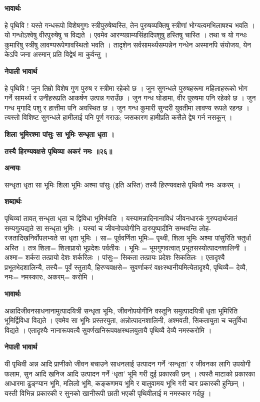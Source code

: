 \documentclass[11pt, a5paper]{article}
\begin{document}
\textbf{भावार्थः}

हे पृथिवि ! यस्ते गन्धरूपो विशेषगुणः स्त्रीपुरुषेष्वस्ति, तेन पुरुषव्यक्तिषु स्त्रीणां भोग्यत्वमभिलाषश्च भवति । यो गन्धोऽश्वेषु वीरपुरुषेषु च विद्यते । एवमेव आरण्यग्राम्यसिंहादिपशुषु हस्तिषु चास्ति । तथा च यो गन्धः कुमारिषु स्त्रीषु लावण्यरूपेणावस्थितो भवति । तादृशेन सर्वसामर्थ्यसम्पन्नेन गन्धेन अस्मानपि संयोजय, येन केऽपि जना अस्मान् प्रति विद्वेषं मा कुर्वन्तु ।

\textbf{नेपाली भावार्थ}

हे पृथिवि ! जुन तिम्रो विशेष गुण पुरुष र स्त्रीमा रहेको छ । जुन सुगन्धले पुरुषहरूमा महिलाहरूको भोग गर्ने सामर्थ्य र उनीहरूप्रति आकर्षण उत्पन्न गराउँछ । जुन गन्ध घोडामा, वीर पुरुषमा पनि रहेको छ । जुन गन्ध मृगादि पशु र हात्तीमा पनि अवस्थित छ । जुन गन्ध कुमारी सुन्दरी युवतीमा लावण्य रूपले रहन्छ । त्यस्तो विशिष्ट सुगन्धले हामीलाई पनि पूर्ण गराऊ; जसकारण हामीप्रति कसैले द्वेष गर्न नसकून् ।

\textbf{शिला भूमिरश्मा पांसुः सा भूमिः सन्धृता धृता ।}

\textbf{तस्यै हिरण्यवक्षसे पृथिव्या अकरं नमः ॥२६॥}

\textbf{अन्वयः}

सन्धृता धृता सा भूमिः शिला भूमिः अश्मा पांसुः (इति अस्ति) तस्यै हिरण्यवक्षसे पृथिव्यै नमः अकरम् ।

\textbf{शब्दार्थः}

पृथिव्यां तावत् सन्धृता धृता च द्विविधा भूमिर्भवति । यस्यामन्नादिनानाविधं जीवनधारकं गुरुपदार्थजातं सम्यगुत्पद्यते सा सन्धृता भूमिः । यस्यां च जीवनोपयोगीनि दारुपुष्पादीनि सम्भवन्ति लोह-रजतादिखनिर्वोपलभ्यते सा धृता भूमिः । सा= पूर्ववर्णिता भूमिः= पृथ्वी, शिला भूमिः अश्मा पांसुरिति चतुर्धा अस्ति । तत्र शिला= शिलाप्रायो भूप्रदेशः पर्वतीयः । भूमिः =  भूमगुणवत्वात् प्रभूतसस्योत्पादनशालिनी । अश्मा= शर्करा तत्प्रायो देशः शर्करिलः । पांसुः= सिकता तत्प्रायः प्रदेशः सिकतिलः । एतादृश्यै प्रभूतभेदशालिन्यै, तस्यै= पूर्वं स्तुतायै, हिरण्यवक्षसे= सुवर्णाकरं वक्षःस्थानीयमित्येतादृश्यै, पृथिव्यै= देव्यै, नमः= नमस्कारः, अकरम्= करोमि ।

\textbf{भावार्थः}

अन्नादिजीवनसाधनानामुत्पादयित्री सन्धृता भूमिः, जीवनोपयोगीनि वस्तूनि समुत्पादयित्री धृता भूमिरिति भूमिर्द्विविधा विद्यते । एवमेव सा भूमिः प्रस्तरयुता, अन्नोत्पादनशालिनी, अश्मवती, सिकतायुता च चतुर्विधा विद्यते । एतादृश्यैः नानारूपवत्यै सुवर्णखनिरूपवक्षस्थलयुतायै पृथिव्यै देव्यै नमस्करोमि ।

\textbf{नेपाली भावार्थ}

यी पृथिवी अन्न आदि प्राणीको जीवन बचाउने साधनलाई उत्पादन गर्ने ‘सन्धृता’ र जीवनका लागि उपयोगी फलाम, सुन आदि खनिज आदि उत्पादन गर्ने ‘धृता’ भूमि गरी दुई प्रकारकी छन् । त्यस्तै माटाको प्रकारका आधारमा ढुङ्‍ग्यान भूमि, मलिलो भूमि, कङ्कणमय भूमि र बालुवामय भूभि गरी चार प्रकारकी हुन्छिन् । यस्ती विभिन्न प्रकारकी र सुनको खानीरूपी छाती भएकी पृथिवीलाई म नमस्कार गर्दछु ।
\end{document}
